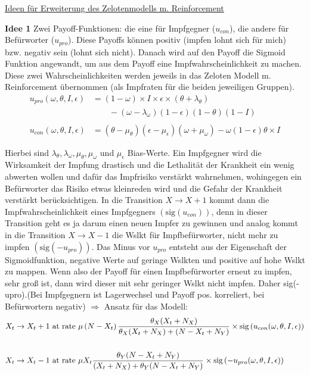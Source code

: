 \documentclass[10pt,a4paper]{article}
\begin{document}
	\begin{center}
		\underline{Ideen für Erweiterung des Zelotenmodells m. Reinforcement}
	\end{center}
\textbf{Idee 1}\newline
Zwei Payoff-Funktionen: die eine für Impfgegner ($u_{con}$), die andere für Befürworter ($u_{pro}$). Diese Payoffs können positiv (impfen lohnt sich für mich) bzw. negativ sein (lohnt sich nicht). Danach wird auf den Payoff die Sigmoid Funktion angewandt, um aus dem Payoff eine Impfwahrscheinlichkeit zu machen. Diese zwei Wahrscheinlichkeiten werden jeweils in das Zeloten Modell m. Reinforcement übernommen (als Impfraten für die beiden jeweiligen Gruppen).
	\begin{align*}
		u_{pro}(\omega, \theta, I, \epsilon) &= (1-\omega) \times I \times \epsilon \times (\theta + \lambda_{\theta}) \\
		&\qquad - (\omega - \lambda_{\omega})(1-\epsilon)(1-\theta)(1-I)\\
	&\\
		u_{con}(\omega, \theta, I, \epsilon) &= (\theta - \mu_{\theta})(\epsilon - \mu_{\epsilon})(\omega + \mu_{\omega}) - \omega(1-\epsilon)\theta \times I
	\end{align*}
	
Hierbei sind $\lambda_{\theta}, \lambda_{\omega}, \mu_{\theta}, \mu_{\omega}$ und $\mu_{\epsilon}$ Bias-Werte. Ein Impfgegner wird die Wirksamkeit der Impfung drastisch und die Lethalität der Krankheit ein wenig abwerten wollen und dafür das Impfrisiko verstärkt wahrnehmen, wohingegen ein Befürworter das Risiko etwas kleinreden wird und die Gefahr der Krankheit verstärkt berücksichtigen.\newline
In die Transition $X \rightarrow X + 1$ kommt dann die Impfwahrscheinlichkeit eines Impfgegners $(\mathrm{sig}\left( u_{con}\right))$, denn in dieser Transition geht es ja darum einen neuen Impfer zu gewinnen und analog kommt in die Transition $X \rightarrow X-1$ die Wslkt für Impfbefürworter, nicht mehr zu impfen $(\mathrm{sig}\left( -u_{pro}\right))$.\newline
Das Minus vor $u_{pro}$ entsteht aus der Eigenschaft der Sigmoidfunktion, negative Werte auf geringe Wslkten und positive auf hohe Wslkt zu mappen. Wenn also der Payoff für einen Impfbefürworter erneut zu impfen, sehr groß ist, dann wird dieser mit sehr geringer Wslkt nicht impfen. Daher sig(-upro).(Bei Impfgegnern ist Lagerwechsel und Payoff pos. korreliert, bei Befürwortern negativ)\newline
$\Rightarrow$ Ansatz für das Modell:
\begin{align*}
\begin{split}
X_t \rightarrow X_t + 1 & \textnormal{ at rate } \mu\left(N-X_t\right)\frac{\theta_X (X_t + N_X)}{\theta_X (X_t + N_X) + (N - X_t + N_Y)} \times \mathrm{sig}\left(u_{con}(\omega, \theta, I, \epsilon)\right) \\
&\\
X_t \rightarrow X_t - 1 & \textnormal{ at rate } \mu X_t\frac{\theta_Y(N-X_t+N_Y)}{(X_t + N_X) + \theta_Y(N-X_t+N_Y)} \times \mathrm{sig}\left(- u_{pro}(\omega, \theta, I, \epsilon)\right)
\end{split}
\end{align*}
\end{document}
